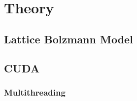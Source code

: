 \section{Theory}

\subsection{Lattice Bolzmann Model}

\subsection{CUDA}

\subsubsection{Multithreading}